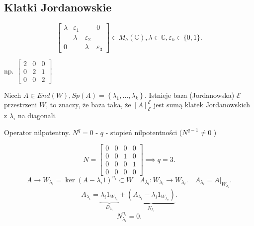 \documentclass[../main.tex]{subfiles}
\begin{document}
\subsection{Klatki Jordanowskie}
\[
    \begin{bmatrix} \lambda& \varepsilon_1&&0\\ &\lambda& \varepsilon_2&\\ 0&&\lambda&\varepsilon_3 \end{bmatrix} \in M_h(\mathbb{C}), \lambda \in \mathbb{C}, \varepsilon_k \in \{0,1\}
.\]
\begin{przyklad}
    np. $\begin{bmatrix} 2&0&0\\0&2&1\\0&0&2 \end{bmatrix} $
\end{przyklad}
\begin{tw}
    Niech $A\in End(W), Sp(A) = \left\{ \lambda_1,\ldots,\lambda_k \right\} $. Istnieje baza (Jordanowska) $\mathcal{E}$ przestrzeni $W$, to znaczy, że baza taka, że $[A]_\mathcal{E}^\mathcal{E}$ jest sumą klatek Jordanowskich z $\lambda_i$ na diagonali.\\
\end{tw}
Operator nilpotentny. $N^q = 0$ - $q$ - stopień nilpotentności ($N^{q-1} \neq 0$ )
\begin{przyklad}
    \[
        N = \begin{bmatrix} 0&0&0&0\\0&0&1&0\\0&0&0&1\\0&0&0&0 \end{bmatrix} \implies q = 3
    .\]
    \[
        A\to W_{\lambda_i} = \ker(A-\lambda_i 1)^{n_i}\subset W\quad A_{\lambda_i}: W_{\lambda_i} \to W_{\lambda_i}.\quad A_{\lambda_i} = A|_{W_{\lambda_i}}
    .\]
    \[
        A_{\lambda_i} = \underbrace{\lambda_i 1_{W_{\lambda_i}}}_{D_{\lambda_i}} + \underbrace{(A_{\lambda_i} - \lambda_i 1_{W_{\lambda_i}})}_{N_{\lambda_i}}
    .\]
    \[
    N_{\lambda_i}^{n_i} = 0
    .\]
\end{przyklad}
\end{document}
